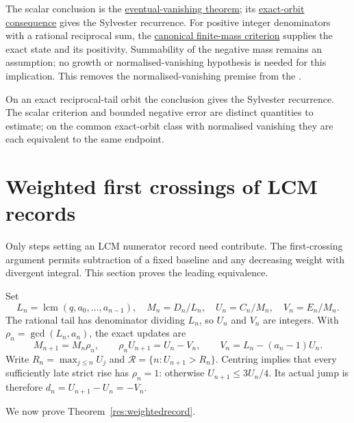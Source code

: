 \documentclass[11pt]{article}
\begin{document}
\noindent The scalar conclusion is the
\href{https://github.com/wcook04/plectis-erdos/blob/d058b9150218ae23d2cfd975580088d6167e9da8/ErdosProblems/Erdos243/SparseResetRecovery.lean#L612}{eventual-vanishing theorem};
its \href{https://github.com/wcook04/plectis-erdos/blob/d058b9150218ae23d2cfd975580088d6167e9da8/ErdosProblems/Erdos243/SparseResetRecovery.lean#L690}{exact-orbit consequence}
gives the Sylvester recurrence. For positive integer denominators with a
rational reciprocal sum, the
\href{https://github.com/wcook04/plectis-erdos/blob/d058b9150218ae23d2cfd975580088d6167e9da8/ErdosProblems/Erdos243/PaperCompleteR8/CanonicalNegativeMass.lean#L19}{canonical finite-mass criterion}
supplies the exact state and its positivity. Summability of the negative mass
remains an assumption; no growth or normalised-vanishing hypothesis is needed
for this implication.
This removes the normalised-vanishing premise from the
.

On an exact reciprocal-tail orbit the conclusion gives the Sylvester
recurrence. The scalar criterion and bounded negative error are distinct
quantities to estimate; on the common exact-orbit class with normalised
vanishing they are each equivalent to the same endpoint.

\section{Weighted first crossings of LCM records}\label{sec:lcmrecords}

Only steps setting an LCM numerator record need contribute. The first-crossing
argument permits subtraction of a fixed baseline and any decreasing weight
with divergent integral. This section proves the leading equivalence.

Set
\[
 L_n=\operatorname{lcm}(q,a_0,\ldots,a_{n-1}),\quad
 M_n=D_n/L_n,\quad U_n=C_n/M_n,\quad V_n=E_n/M_n.
\]
The rational tail has denominator dividing $L_n$, so $U_n$ and $V_n$ are
integers. With $\rho_n=\gcd(L_n,a_n)$, the exact updates are
\[
 M_{n+1}=M_n\rho_n,\qquad
 \rho_nU_{n+1}=U_n-V_n,\qquad V_n=L_n-(a_n-1)U_n.
\]
Write $R_n=\max_{j\le n}U_j$ and
$\mathcal R=\{n:U_{n+1}>R_n\}$. Centring implies that every sufficiently
late strict rise has $\rho_n=1$: otherwise $U_{n+1}\le3U_n/4$.
Its actual jump is therefore $d_n=U_{n+1}-U_n=-V_n$.

We now prove Theorem~\ref{res:weightedrecord}.
\end{document}
